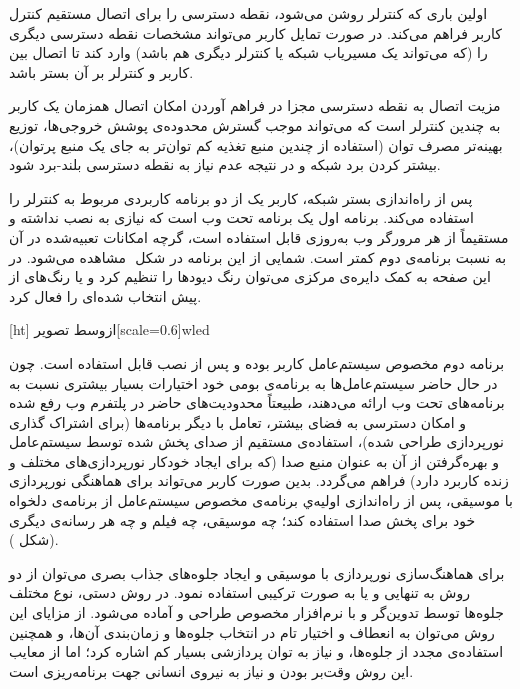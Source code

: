 اولین باری که کنترلر روشن می‌شود، نقطه دسترسی را برای اتصال مستقیم کنترل کاربر فراهم می‌کند. در صورت تمایل کاربر می‌تواند مشخصات نقطه دسترسی دیگری را (که می‌تواند یک مسیریاب شبکه یا کنترلر دیگری هم باشد) وارد کند تا اتصال بین کاربر و کنترلر بر آن بستر باشد.

مزیت اتصال به نقطه دسترسی مجزا در فراهم آوردن امکان اتصال همزمان یک کاربر به چندین کنترلر است که می‌تواند موجب گسترش محدوده‌ی پوشش خروجی‌ها، توزیع بهینه‌تر مصرف توان (استفاده از چندین منبع تغذیه کم توان‌تر به جای یک منبع پرتوان)، بیشتر کردن برد شبکه و در نتیجه عدم نیاز به نقطه دسترسی بلند-برد شود.

پس از راه‌اندازی بستر شبکه، کاربر یک از دو برنامه کاربردی مربوط به کنترلر را استفاده می‌کند. برنامه اول یک برنامه تحت وب است که نیازی به نصب نداشته و مستقیماً از هر مرورگر وب به‌روزی قابل استفاده است، گرچه امکانات تعبیه‌شده در آن به نسبت برنامه‌ی دوم کمتر است. شمایی از این برنامه در شکل ‌ مشاهده می‌شود. در این صفحه به کمک دایره‌ی مرکزی می‌توان رنگ دیودها را تنظیم کرد و یا رنگ‌های از پیش انتخاب شده‌ای را فعال کرد.

[ht]
‌ازوسط
‌تصویر[scale=0.6]{wled}

برنامه دوم مخصوص سیستم‌عامل کاربر بوده و پس از نصب قابل استفاده است. چون در حال حاضر سیستم‌عامل‌ها به برنامه‌ی بومی خود اختیارات بسیار بیشتری نسبت به برنامه‌های تحت وب ارائه می‌دهند، طبیعتاً محدودیت‌های حاضر در پلتفرم وب رفع شده و امکان دسترسی به فضای بیشتر، تعامل با دیگر برنامه‌ها (برای اشتراک گذاری نورپردازی طراحی شده)، استفاده‌ی مستقیم از صدای پخش شده توسط سیستم‌عامل و بهره‌گرفتن از آن به عنوان منبع صدا (که برای ایجاد خودکار نورپردازی‌های مختلف و زنده کاربرد دارد) فراهم می‌گردد. بدین صورت کاربر می‌تواند برای هماهنگی نورپردازی با موسیقی، پس از راه‌اندازی اولیه‌ي برنامه‌ی مخصوص سیستم‌عامل از برنامه‌ی دلخواه خود برای پخش صدا استفاده کند؛ چه موسیقی، چه فیلم و چه هر رسانه‌ی دیگری (شکل ).

برای هماهنگ‌سازی نورپردازی با موسیقی و ایجاد جلوه‌های جذاب بصری می‌توان از دو روش به تنهایی و یا به صورت ترکیبی استفاده نمود. در روش دستی، نوع مختلف جلوه‌ها توسط تدوین‌گر و با نرم‌افزار مخصوص طراحی و آماده می‌شود. از مزایای این روش می‌توان به انعطاف و اختیار تام در انتخاب جلوه‌ها و زمان‌بندی آن‌ها، و همچنین استفاده‌ی مجدد از جلوه‌ها، و نیاز به توان پردازشی بسیار کم اشاره کرد؛ اما از معایب این روش وقت‌بر بودن و نیاز به نیروی انسانی جهت برنامه‌ریزی است.

